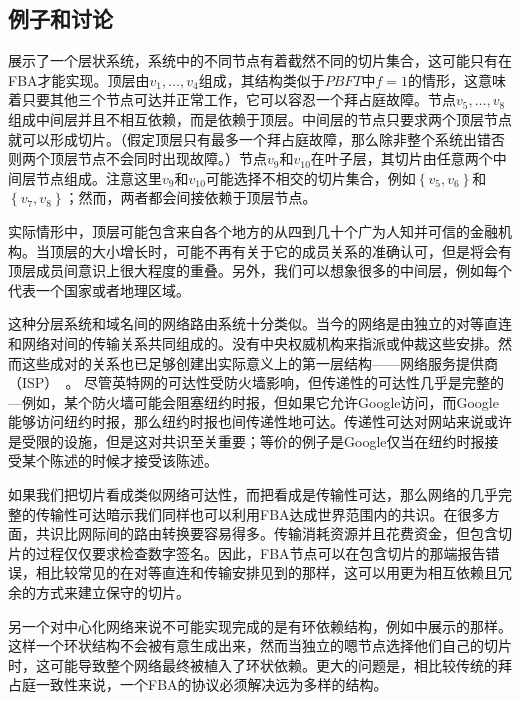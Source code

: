 \subsection{例子和讨论}
展示了一个层状系统，系统中的不同节点有着截然不同的切片集合，这可能只有在FBA才能实现。顶层由$v_1,\ldots,v_4$组成，其结构类似于$PBFT$中$f=1$的情形，这意味着只要其他三个节点可达并正常工作，它可以容忍一个拜占庭故障。节点$v_5,\ldots,v_8$组成中间层并且不相互依赖，而是依赖于顶层。中间层的节点只要求两个顶层节点就可以形成切片。（假定顶层只有最多一个拜占庭故障，那么除非整个系统出错否则两个顶层节点不会同时出现故障。）节点$v_9$和$v_10$在叶子层，其切片由任意两个中间层节点组成。注意这里$v_9$和$v_10$可能选择不相交的切片集合，例如$\left\{v_5,v_6\right\}$和$\left\{v_7,v_8\right\}$；然而，两者都会间接依赖于顶层节点。

实际情形中，顶层可能包含来自各个地方的从四到几十个广为人知并可信的金融机构。当顶层的大小增长时，可能不再有关于它的成员关系的准确认可，但是将会有顶层成员间意识上很大程度的重叠。另外，我们可以想象很多的中间层，例如每个代表一个国家或者地理区域。

这种分层系统和域名间的网络路由系统十分类似。当今的网络是由独立的对等直连和网络对间的传输关系共同组成的。没有中央权威机构来指派或仲裁这些安排。然而这些成对的关系也已足够创建出实际意义上的第一层结构——网络服务提供商（ISP）~\cite{peer_isp2010}。	尽管英特网的可达性受防火墙影响，但传递性的可达性几乎是完整的---例如，某个防火墙可能会阻塞纽约时报，但如果它允许Google访问，而Google能够访问纽约时报，那么纽约时报也间传递性地可达。传递性可达对网站来说或许是受限的设施，但是这对共识至关重要；等价的例子是Google仅当在纽约时报接受某个陈述的时候才接受该陈述。

如果我们把{\quorum}切片看成类似网络可达性，而把{\quorum}看成是传输性可达，那么网络的几乎完整的传输性可达暗示我们同样也可以利用FBA达成世界范围内的共识。在很多方面，共识比网际间的路由转换要容易得多。传输消耗资源并且花费资金，但包含切片的过程仅仅要求检查数字签名。因此，FBA节点可以在包含切片的那端报告错误，相比较常见的在对等直连和传输安排见到的那样，这可以用更为相互依赖且冗余的方式来建立保守的切片。

另一个对中心化网络来说不可能实现完成的是有环依赖结构，例如中展示的那样。这样一个环状结构不会被有意生成出来，然而当独立的嗯节点选择他们自己的切片时，这可能导致整个网络最终被植入了环状依赖。更大的问题是，相比较传统的拜占庭一致性来说，一个FBA的协议必须解决远为多样的{\quorum}结构。